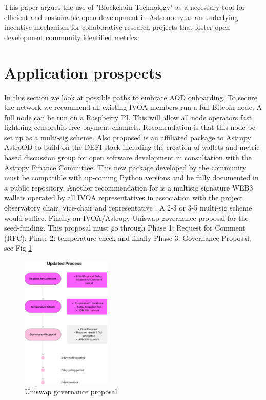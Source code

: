 \documentclass[final,5p,times,twocolumn,authoryear]{elsarticle}
\begin{document}
       
This paper argues the use of "Blockchain Technology" as a necessary tool for efficient and sustainable open development in Astronomy as an underlying incentive mechanism for collaborative research projects that foster open development community identified metrics.  


\section{Application prospects}
\label{sec:5}
%
In this section we look at possible paths to embrace AOD onboarding. To secure the network we recommend all existing IVOA members run a full Bitcoin node. A full node can be run on a Raspberry PI.  This will allow all node operators fast lightning censorship free payment channels. Recomendation is that this node be set up as a multi-sig scheme. Also proposed is an affiliated package to Astropy AstroOD to build on the DEFI stack including the creation of wallets and metric based discussion group for open software development in consultation with the Astropy Finance Committee. This new package developed by the community must be compatible with up-coming Python versions and be fully documented in a public repository. Another recommendation for is a multisig signature WEB3 wallets operated by all IVOA representatives in association with the project observatory chair, vice-chair and representative . A 2-3 or 3-5 multi-sig scheme would suffice. Finally an IVOA/Astropy Uniswap governance proposal for the seed-funding. This proposal must go through 
 Phase 1: Request for Comment (RFC), Phase 2: temperature check and finally Phase 3: Governance Proposal, see Fig \ref{fig:unigov}
%
\begin{figure}
    \centering
    \includegraphics[width=0.38\textwidth]{figs/unigov.png}
    \vspace*{-0.2cm}
    \caption{Uniswap governance proposal}
    \label{fig:unigov}
\end{figure}
\end{document}
